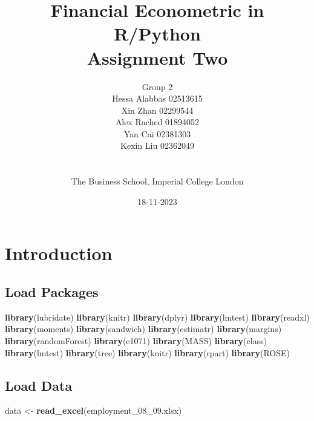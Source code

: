 \documentclass[
]{article}
\title{Financial Econometric in R/Python\\
Assignment Two}
\author{Group 2\\
Hessa Alabbas 02513615\\
Xin Zhan 02299544\\
Alex Rached 01894052\\
Yan Cai 02381303\\
Kexin Liu 02362049\\
\strut \\
The Business School, Imperial College London\\}
\date{18-11-2023}
\newenvironment{Shaded}{\begin{snugshade}}{\end{snugshade}}
\newcommand{\FunctionTok}[1]{\textcolor[rgb]{0.13,0.29,0.53}{\textbf{#1}}}
\newcommand{\NormalTok}[1]{#1}
\newcommand{\OtherTok}[1]{\textcolor[rgb]{0.56,0.35,0.01}{#1}}
\newcommand{\StringTok}[1]{\textcolor[rgb]{0.31,0.60,0.02}{#1}}
\begin{document}
\maketitle

\newpage
\tableofcontents
\listoftables
\newpage

\pagebreak

\hypertarget{introduction}{%
\section{Introduction}\label{introduction}}

\hypertarget{load-packages}{%
\subsection{Load Packages}\label{load-packages}}

\begin{Shaded}
\begin{Highlighting}[]
\FunctionTok{library}\NormalTok{(lubridate)}
\FunctionTok{library}\NormalTok{(knitr)}
\FunctionTok{library}\NormalTok{(dplyr)}
\FunctionTok{library}\NormalTok{(lmtest)}
\FunctionTok{library}\NormalTok{(readxl)}
\FunctionTok{library}\NormalTok{(moments)}
\FunctionTok{library}\NormalTok{(sandwich)}
\FunctionTok{library}\NormalTok{(estimatr)}
\FunctionTok{library}\NormalTok{(margins) }
\FunctionTok{library}\NormalTok{(randomForest)}
\FunctionTok{library}\NormalTok{(e1071) }
\FunctionTok{library}\NormalTok{(MASS) }
\FunctionTok{library}\NormalTok{(class) }
\FunctionTok{library}\NormalTok{(lmtest)}
\FunctionTok{library}\NormalTok{(tree)}
\FunctionTok{library}\NormalTok{(knitr)}
\FunctionTok{library}\NormalTok{(rpart)}
\FunctionTok{library}\NormalTok{(ROSE)}
\end{Highlighting}
\end{Shaded}

\hypertarget{load-data}{%
\subsection{Load Data}\label{load-data}}

\begin{Shaded}
\begin{Highlighting}[]
\NormalTok{data }\OtherTok{\textless{}{-}}  \FunctionTok{read\_excel}\NormalTok{(}\StringTok{\textquotesingle{}employment\_08\_09.xlsx\textquotesingle{}}\NormalTok{)}
\end{Highlighting}
\end{Shaded}
\end{document}
